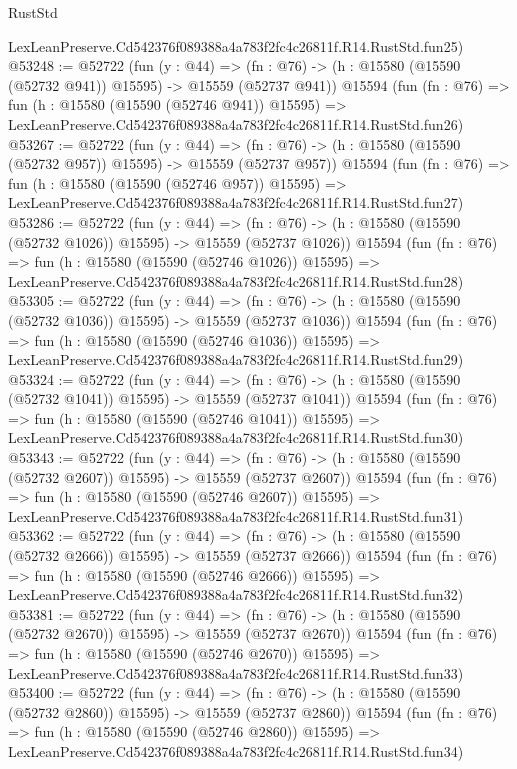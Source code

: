 \begin{lexlean}{RustStd}
\begin{coremodule}
    LexLeanPreserve.Cd542376f089388a4a783f2fc4c26811f.R14.RustStd.fun25)
@53248 := @52722
    (fun (y : @44) =>
    (fn : @76) -> (h : @15580 (@15590 (@52732 @941)) @15595) -> @15559 (@52737 @941))
    @15594
    (fun (fn : @76) =>
    fun (h : @15580 (@15590 (@52746 @941)) @15595) =>
    LexLeanPreserve.Cd542376f089388a4a783f2fc4c26811f.R14.RustStd.fun26)
@53267 := @52722
    (fun (y : @44) =>
    (fn : @76) -> (h : @15580 (@15590 (@52732 @957)) @15595) -> @15559 (@52737 @957))
    @15594
    (fun (fn : @76) =>
    fun (h : @15580 (@15590 (@52746 @957)) @15595) =>
    LexLeanPreserve.Cd542376f089388a4a783f2fc4c26811f.R14.RustStd.fun27)
@53286 := @52722
    (fun (y : @44) =>
    (fn : @76) -> (h : @15580 (@15590 (@52732 @1026)) @15595) -> @15559 (@52737 @1026))
    @15594
    (fun (fn : @76) =>
    fun (h : @15580 (@15590 (@52746 @1026)) @15595) =>
    LexLeanPreserve.Cd542376f089388a4a783f2fc4c26811f.R14.RustStd.fun28)
@53305 := @52722
    (fun (y : @44) =>
    (fn : @76) -> (h : @15580 (@15590 (@52732 @1036)) @15595) -> @15559 (@52737 @1036))
    @15594
    (fun (fn : @76) =>
    fun (h : @15580 (@15590 (@52746 @1036)) @15595) =>
    LexLeanPreserve.Cd542376f089388a4a783f2fc4c26811f.R14.RustStd.fun29)
@53324 := @52722
    (fun (y : @44) =>
    (fn : @76) -> (h : @15580 (@15590 (@52732 @1041)) @15595) -> @15559 (@52737 @1041))
    @15594
    (fun (fn : @76) =>
    fun (h : @15580 (@15590 (@52746 @1041)) @15595) =>
    LexLeanPreserve.Cd542376f089388a4a783f2fc4c26811f.R14.RustStd.fun30)
@53343 := @52722
    (fun (y : @44) =>
    (fn : @76) -> (h : @15580 (@15590 (@52732 @2607)) @15595) -> @15559 (@52737 @2607))
    @15594
    (fun (fn : @76) =>
    fun (h : @15580 (@15590 (@52746 @2607)) @15595) =>
    LexLeanPreserve.Cd542376f089388a4a783f2fc4c26811f.R14.RustStd.fun31)
@53362 := @52722
    (fun (y : @44) =>
    (fn : @76) -> (h : @15580 (@15590 (@52732 @2666)) @15595) -> @15559 (@52737 @2666))
    @15594
    (fun (fn : @76) =>
    fun (h : @15580 (@15590 (@52746 @2666)) @15595) =>
    LexLeanPreserve.Cd542376f089388a4a783f2fc4c26811f.R14.RustStd.fun32)
@53381 := @52722
    (fun (y : @44) =>
    (fn : @76) -> (h : @15580 (@15590 (@52732 @2670)) @15595) -> @15559 (@52737 @2670))
    @15594
    (fun (fn : @76) =>
    fun (h : @15580 (@15590 (@52746 @2670)) @15595) =>
    LexLeanPreserve.Cd542376f089388a4a783f2fc4c26811f.R14.RustStd.fun33)
@53400 := @52722
    (fun (y : @44) =>
    (fn : @76) -> (h : @15580 (@15590 (@52732 @2860)) @15595) -> @15559 (@52737 @2860))
    @15594
    (fun (fn : @76) =>
    fun (h : @15580 (@15590 (@52746 @2860)) @15595) =>
    LexLeanPreserve.Cd542376f089388a4a783f2fc4c26811f.R14.RustStd.fun34)

\end{coremodule}
\end{lexlean}

